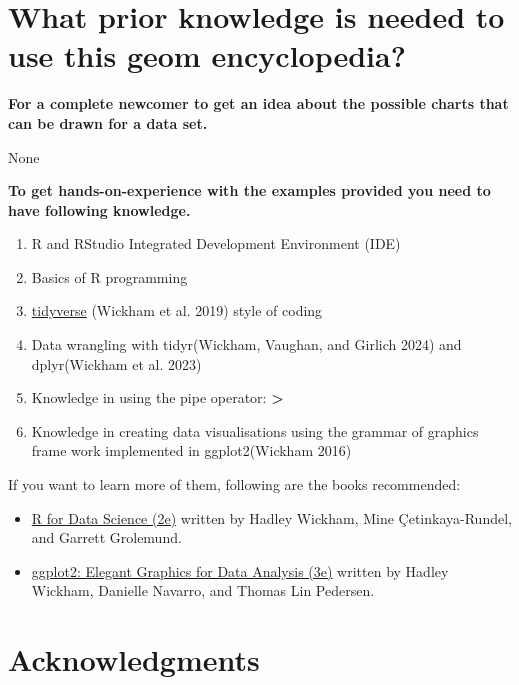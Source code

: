 \documentclass[
  letterpaper,
  DIV=11,
  numbers=noendperiod]{scrreprt}
\begin{document}
\section*{\texorpdfstring{What prior knowledge is needed to use this
{geom
encyclopedia}?}{What prior knowledge is needed to use this geom encyclopedia?}}\label{what-prior-knowledge-is-needed-to-use-this-geom-encyclopedia}


\textbf{For a complete newcomer to get an idea about the possible charts
that can be drawn for a data set.}

None

\textbf{To get hands-on-experience with the examples provided you need
to have following knowledge.}

\begin{enumerate}
\def\labelenumi{\arabic{enumi}.}
\item
  R and RStudio Integrated Development Environment (IDE)
\item
  Basics of R programming
\item
  \href{https://www.tidyverse.org/}{tidyverse} (Wickham et al. 2019)
  style of coding
\item
  Data wrangling with tidyr(Wickham, Vaughan, and Girlich 2024) and
  dplyr(Wickham et al. 2023)
\item
  Knowledge in using the pipe operator: \textbf{\textbar\textgreater{}}
\item
  Knowledge in creating data visualisations using the grammar of
  graphics frame work implemented in ggplot2(Wickham 2016)
\end{enumerate}

If you want to learn more of them, following are the books recommended:

\begin{itemize}
\item
  \href{https://r4ds.hadley.nz/}{R for Data Science (2e)} written by
  Hadley Wickham, Mine Çetinkaya-Rundel, and Garrett Grolemund.
\item
  \href{https://ggplot2-book.org/}{ggplot2: Elegant Graphics for Data
  Analysis (3e)} written by Hadley Wickham, Danielle Navarro, and Thomas
  Lin Pedersen.
\end{itemize}

\section*{Acknowledgments}\label{acknowledgments}
\end{document}
